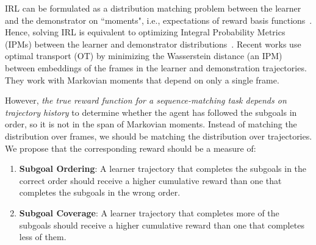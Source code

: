 IRL can be formulated as a distribution matching problem between the learner and the demonstrator on ``moments", i.e., expectations of reward basis functions~\cite{swamy2021moments}. 
Hence, solving IRL is equivalent to optimizing Integral Probability Metrics (IPMs) between the learner and demonstrator distributions~\cite{sun2019provably}. Recent works use optimal transport (OT) by minimizing the Wasserstein distance (an IPM) between embeddings of the frames in the learner and demonstration trajectories. 
They work with Markovian moments that depend on only a single frame.

However, \emph{the true reward function for a sequence-matching task depends on trajectory history} to determine whether the agent has followed the subgoals in order, so it is not in the span of Markovian moments.
Instead of matching the distribution over frames, we should be matching the distribution over trajectories.
We propose that the corresponding reward should be a measure of:
\begin{enumerate}[noitemsep, topsep=0pt]
    \item \textbf{Subgoal Ordering}: A learner trajectory that completes the subgoals in the correct order should receive a higher cumulative reward than one that completes the subgoals in the wrong order.
    \item \textbf{Subgoal Coverage}: A learner trajectory that completes more of the subgoals should receive a higher cumulative reward than one that completes less of them.
\end{enumerate}

